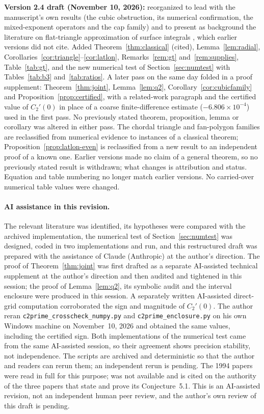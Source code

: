 \documentclass[11pt]{article}
\theoremstyle{remark}
\begin{document}
\textbf{Version 2.4 draft (November 10, 2026):} reorganized to lead with the manuscript's own
results (the cubic obstruction, its numerical confirmation, the mixed-exponent operators and
the cap family) and to present as background the literature on
flat-triangle approximation of surface integrals
\cite{georg91,georgtausch,verlindencools,lyness94}, which earlier versions did not cite.
Added Theorem~\ref{thm:classical} (cited), Lemma~\ref{lem:radial},
Corollaries~\ref{cor:triangle}--\ref{cor:latlon}, Remarks~\ref{rem:gt} and~\ref{rem:supplies},
Table~\ref{tab:gt}, and the new numerical test of Section~\ref{sec:numtest} with
Tables~\ref{tab:b3} and~\ref{tab:ratios}. A later pass on the same day folded in a proof supplement:
Theorem~\ref{thm:joint}, Lemma~\ref{lem:q2}, Corollary~\ref{cor:cubicfamily} and
Proposition~\ref{prop:certified}, with a related-work paragraph and the certified value of
$C_2'(0)$ in place of a coarse finite-difference estimate ($-6.806\times10^{-4}$) used in the
first pass. No previously stated theorem, proposition, lemma or corollary was altered in
either pass. The chordal triangle and fan-polygon families are reclassified from
numerical evidence to instances of a classical theorem; Proposition~\ref{prop:latlon-even} is
reclassified from a new result to an independent proof of a known one. Earlier versions made
no claim of a general theorem, so no previously stated result is withdrawn; what changes is
attribution and status. Equation and table numbering no longer match earlier versions. No
carried-over numerical table values were changed.

\paragraph{AI assistance in this revision.}
The relevant literature was identified, its hypotheses were compared with the archived
implementation, the numerical test of Section~\ref{sec:numtest} was designed, coded in two implementations and run, and this
restructured draft was prepared with the assistance of Claude (Anthropic) at the author's
direction. The proof of Theorem~\ref{thm:joint} was first drafted as a separate AI-assisted technical
supplement at the author's direction and then audited and tightened in this session; the
proof of Lemma~\ref{lem:q2}, its symbolic audit and the interval enclosure were produced in
this session. A separately written AI-assisted direct-grid computation corroborated the sign
and magnitude of $C_2'(0)$. The author reran \texttt{c2prime\_crosscheck\_numpy.py} and
\texttt{c2prime\_enclosure.py} on his own Windows machine on November~10, 2026 and obtained the
same values, including the certified sign. Both implementations of the numerical test came from the same AI-assisted session, so their agreement shows
precision stability, not independence. The scripts are archived and deterministic so that the
author and readers can rerun them; an independent rerun is pending. The 1994 papers
\cite{georgtausch,verlindencools,lyness94} were read in full for this purpose;
\cite{georg91} was not available and is cited on the authority of the three papers that state
and prove its Conjecture~5.1. This is an AI-assisted revision, not an independent human peer
review, and the author's own review of this draft is pending.
\end{document}

